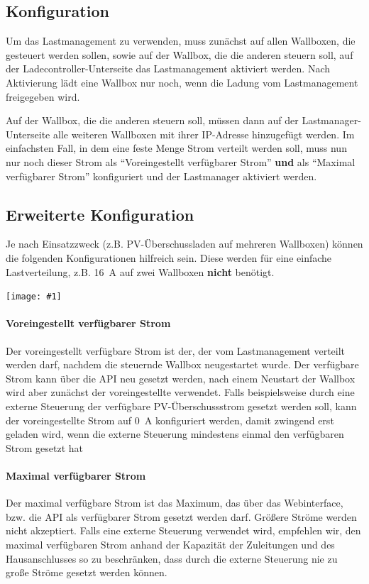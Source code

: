 \documentclass[a4paper,10pt]{article}
\newcommand{\gfx}[1]{\texttt{[image: \#1]}}
\begin{document}
\begin{multicols*}{2}
	\subsection{Konfiguration}
	Um das Lastmanagement zu verwenden, muss zunächst auf allen Wallboxen, die gesteuert werden sollen,
	sowie auf der Wallbox, die die anderen steuern soll, auf der Ladecontroller-Unterseite
	das Lastmanagement aktiviert werden. Nach Aktivierung lädt eine Wallbox nur noch,
	wenn die Ladung vom Lastmanagement freigegeben wird.

	Auf der Wallbox, die die anderen steuern soll, müssen dann auf der Lastmanager-Unterseite
	alle weiteren Wallboxen mit ihrer IP-Adresse hinzugefügt werden.
	Im einfachsten Fall, in dem eine feste Menge Strom verteilt werden soll, muss nun nur noch dieser
	Strom als \enquote{Voreingestellt verfügbarer Strom} \textbf{und} als \enquote{Maximal verfügbarer Strom}
	konfiguriert und der Lastmanager aktiviert werden.

	\subsection{Erweiterte Konfiguration}
	Je nach Einsatzzweck (z.B. PV-Überschussladen auf mehreren Wallboxen) können die folgenden Konfigurationen hilfreich sein.
	Diese werden für eine einfache Lastverteilung, z.B. \SI{16}{\ampere} auf zwei Wallboxen \textbf{nicht} benötigt.

	\gfx{./img_warp2/resized/web_charge_manager}

	\paragraph{Voreingestellt verfügbarer Strom}
	Der voreingestellt verfügbare Strom ist der, der vom Lastmanagement verteilt werden darf, nachdem die steuernde Wallbox
	neugestartet wurde. Der verfügbare Strom kann über die API neu gesetzt werden, nach einem Neustart der Wallbox wird aber
	zunächst der voreingestellte verwendet. Falls beispielsweise durch eine externe Steuerung der verfügbare PV-Überschussstrom
	gesetzt werden soll, kann der voreingestellte Strom auf \SI{0}{\ampere} konfiguriert werden, damit zwingend erst geladen wird,
	wenn die externe Steuerung mindestens einmal den verfügbaren Strom gesetzt hat

	\paragraph{Maximal verfügbarer Strom}
	Der maximal verfügbare Strom ist das Maximum, das über das Webinterface, bzw. die API als verfügbarer Strom gesetzt werden darf.
	Größere Ströme werden nicht akzeptiert. Falls eine externe Steuerung verwendet wird, empfehlen wir, den maximal verfügbaren Strom
	anhand der Kapazität der Zuleitungen und des Hausanschlusses so zu beschränken, dass durch die externe Steuerung nie zu große
	Ströme gesetzt werden können.


\end{multicols*}
\end{document}
